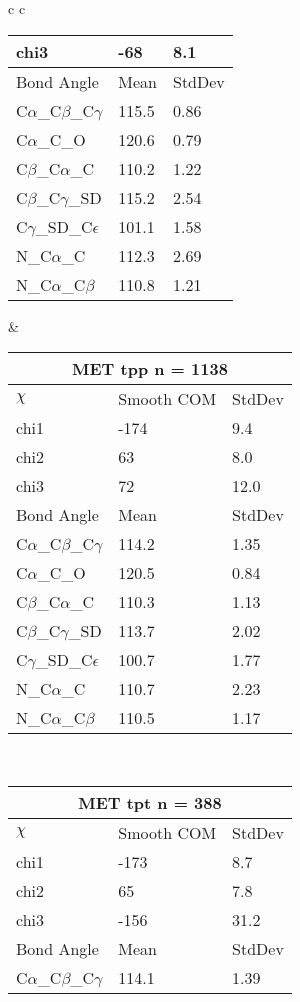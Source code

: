 \begin{longtable}{ c c }
\begin{tabular}{ l l l }
  chi3 & -68 & 8.1 \\ \midrule
  Bond Angle   & Mean     & StdDev \\ \midrule
  C$\alpha$\_C$\beta$\_C$\gamma$ & 115.5 & 0.86\\
  C$\alpha$\_C\_O & 120.6 & 0.79\\
  C$\beta$\_C$\alpha$\_C & 110.2 & 1.22\\
  C$\beta$\_C$\gamma$\_SD & 115.2 & 2.54\\
  C$\gamma$\_SD\_C$\epsilon$ & 101.1 & 1.58\\
  N\_C$\alpha$\_C & 112.3 & 2.69\\
  N\_C$\alpha$\_C$\beta$ & 110.8 & 1.21\\
  \bottomrule
  \end{tabular}
  &
  \begin{tabular}{ l l l }
  \toprule
  \multicolumn{3}{c}{MET \textbf{tpp} n = 1138} \\ \toprule
  $\chi$       & Smooth COM & StdDev \\ \midrule
  chi1 & -174 & 9.4 \\ 
  chi2 & 63 & 8.0 \\ 
  chi3 & 72 & 12.0 \\ \midrule
  Bond Angle   & Mean     & StdDev \\ \midrule
  C$\alpha$\_C$\beta$\_C$\gamma$ & 114.2 & 1.35\\
  C$\alpha$\_C\_O & 120.5 & 0.84\\
  C$\beta$\_C$\alpha$\_C & 110.3 & 1.13\\
  C$\beta$\_C$\gamma$\_SD & 113.7 & 2.02\\
  C$\gamma$\_SD\_C$\epsilon$ & 100.7 & 1.77\\
  N\_C$\alpha$\_C & 110.7 & 2.23\\
  N\_C$\alpha$\_C$\beta$ & 110.5 & 1.17\\
  \bottomrule
  \end{tabular}
  \\
  \begin{tabular}{ l l l }
  \toprule
  \multicolumn{3}{c}{MET \textbf{tpt} n = 388} \\ \toprule
  $\chi$       & Smooth COM & StdDev \\ \midrule
  chi1 & -173 & 8.7 \\ 
  chi2 & 65 & 7.8 \\ 
  chi3 & -156 & 31.2 \\ \midrule
  Bond Angle   & Mean     & StdDev \\ \midrule
  C$\alpha$\_C$\beta$\_C$\gamma$ & 114.1 & 1.39\\

\end{tabular}
\end{longtable}
